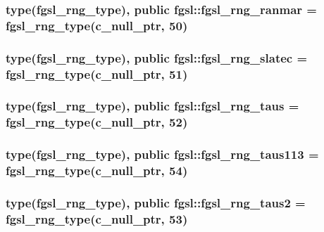 \subsubsection[{fgsl\+\_\+rng\+\_\+ranmar}]{\setlength{\rightskip}{0pt plus 5cm}type({\bf fgsl\+\_\+rng\+\_\+type}), public fgsl\+::fgsl\+\_\+rng\+\_\+ranmar = {\bf fgsl\+\_\+rng\+\_\+type}(c\+\_\+null\+\_\+ptr, 50)}\label{namespacefgsl_a099ffd8b436045a9bd570027a1406df4}
\hypertarget{namespacefgsl_aa8d0035b0617f463167b9fce7aeedd26}{}
\subsubsection[{fgsl\+\_\+rng\+\_\+slatec}]{\setlength{\rightskip}{0pt plus 5cm}type({\bf fgsl\+\_\+rng\+\_\+type}), public fgsl\+::fgsl\+\_\+rng\+\_\+slatec = {\bf fgsl\+\_\+rng\+\_\+type}(c\+\_\+null\+\_\+ptr, 51)}\label{namespacefgsl_aa8d0035b0617f463167b9fce7aeedd26}
\hypertarget{namespacefgsl_a9fe9a6cae0f833d90b9c22d644165758}{}
\subsubsection[{fgsl\+\_\+rng\+\_\+taus}]{\setlength{\rightskip}{0pt plus 5cm}type({\bf fgsl\+\_\+rng\+\_\+type}), public fgsl\+::fgsl\+\_\+rng\+\_\+taus = {\bf fgsl\+\_\+rng\+\_\+type}(c\+\_\+null\+\_\+ptr, 52)}\label{namespacefgsl_a9fe9a6cae0f833d90b9c22d644165758}
\hypertarget{namespacefgsl_a4b4cf5cdf021417e3147d6efff412544}{}
\subsubsection[{fgsl\+\_\+rng\+\_\+taus113}]{\setlength{\rightskip}{0pt plus 5cm}type({\bf fgsl\+\_\+rng\+\_\+type}), public fgsl\+::fgsl\+\_\+rng\+\_\+taus113 = {\bf fgsl\+\_\+rng\+\_\+type}(c\+\_\+null\+\_\+ptr, 54)}\label{namespacefgsl_a4b4cf5cdf021417e3147d6efff412544}
\hypertarget{namespacefgsl_a49b9837652787069b7179152078a6c9d}{}
\subsubsection[{fgsl\+\_\+rng\+\_\+taus2}]{\setlength{\rightskip}{0pt plus 5cm}type({\bf fgsl\+\_\+rng\+\_\+type}), public fgsl\+::fgsl\+\_\+rng\+\_\+taus2 = {\bf fgsl\+\_\+rng\+\_\+type}(c\+\_\+null\+\_\+ptr, 53)}\label{namespacefgsl_a49b9837652787069b7179152078a6c9d}
\hypertarget{namespacefgsl_ae6f6fd654d8c94d4ff5cf3a3eb274ccb}{}
